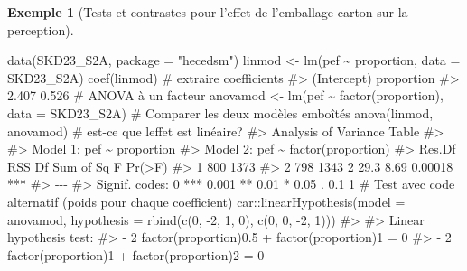 \documentclass[
  11pt,
  letterpaper,
]{scrbook}
\newenvironment{Shaded}{\begin{snugshade}}{\end{snugshade}}
\newcommand{\AttributeTok}[1]{\textcolor[rgb]{0.40,0.45,0.13}{#1}}
\newcommand{\CommentTok}[1]{\textcolor[rgb]{0.37,0.37,0.37}{#1}}
\newcommand{\DecValTok}[1]{\textcolor[rgb]{0.68,0.00,0.00}{#1}}
\newcommand{\FunctionTok}[1]{\textcolor[rgb]{0.28,0.35,0.67}{#1}}
\newcommand{\NormalTok}[1]{\textcolor[rgb]{0.00,0.23,0.31}{#1}}
\newcommand{\OtherTok}[1]{\textcolor[rgb]{0.00,0.23,0.31}{#1}}
\newcommand{\SpecialCharTok}[1]{\textcolor[rgb]{0.37,0.37,0.37}{#1}}
\newcommand{\StringTok}[1]{\textcolor[rgb]{0.13,0.47,0.30}{#1}}
\theoremstyle{plain}
\theoremstyle{plain}
\theoremstyle{definition}
\newtheorem{example}{Exemple}[chapter]
\theoremstyle{definition}
\theoremstyle{remark}
\begin{document}
\begin{example}[Tests et contrastes pour l'effet de l'emballage carton
sur la
perception]
\begin{Shaded}
\begin{Highlighting}[]
\FunctionTok{data}\NormalTok{(SKD23\_S2A, }\AttributeTok{package =} \StringTok{"hecedsm"}\NormalTok{)}
\NormalTok{linmod }\OtherTok{\textless{}{-}} \FunctionTok{lm}\NormalTok{(pef }\SpecialCharTok{\textasciitilde{}}\NormalTok{ proportion, }\AttributeTok{data =}\NormalTok{ SKD23\_S2A)}
\FunctionTok{coef}\NormalTok{(linmod) }\CommentTok{\# extraire coefficients}
\CommentTok{\#\textgreater{} (Intercept)  proportion }
\CommentTok{\#\textgreater{}       2.407       0.526}
\CommentTok{\# ANOVA à un facteur}
\NormalTok{anovamod }\OtherTok{\textless{}{-}} \FunctionTok{lm}\NormalTok{(pef }\SpecialCharTok{\textasciitilde{}} \FunctionTok{factor}\NormalTok{(proportion),}
               \AttributeTok{data =}\NormalTok{ SKD23\_S2A)}
\CommentTok{\# Comparer les deux modèles emboîtés}
\FunctionTok{anova}\NormalTok{(linmod, anovamod) }\CommentTok{\# est{-}ce que l\textquotesingle{}effet est linéaire?}
\CommentTok{\#\textgreater{} Analysis of Variance Table}
\CommentTok{\#\textgreater{} }
\CommentTok{\#\textgreater{} Model 1: pef \textasciitilde{} proportion}
\CommentTok{\#\textgreater{} Model 2: pef \textasciitilde{} factor(proportion)}
\CommentTok{\#\textgreater{}   Res.Df  RSS Df Sum of Sq    F  Pr(\textgreater{}F)    }
\CommentTok{\#\textgreater{} 1    800 1373                              }
\CommentTok{\#\textgreater{} 2    798 1343  2      29.3 8.69 0.00018 ***}
\CommentTok{\#\textgreater{} {-}{-}{-}}
\CommentTok{\#\textgreater{} Signif. codes:  0 \textquotesingle{}***\textquotesingle{} 0.001 \textquotesingle{}**\textquotesingle{} 0.01 \textquotesingle{}*\textquotesingle{} 0.05 \textquotesingle{}.\textquotesingle{} 0.1 \textquotesingle{} \textquotesingle{} 1}
\CommentTok{\# Test avec code alternatif (poids pour chaque coefficient)}
\NormalTok{car}\SpecialCharTok{::}\FunctionTok{linearHypothesis}\NormalTok{(}\AttributeTok{model =}\NormalTok{ anovamod,}
   \AttributeTok{hypothesis =} \FunctionTok{rbind}\NormalTok{(}\FunctionTok{c}\NormalTok{(}\DecValTok{0}\NormalTok{, }\SpecialCharTok{{-}}\DecValTok{2}\NormalTok{, }\DecValTok{1}\NormalTok{, }\DecValTok{0}\NormalTok{),}
                      \FunctionTok{c}\NormalTok{(}\DecValTok{0}\NormalTok{, }\DecValTok{0}\NormalTok{, }\SpecialCharTok{{-}}\DecValTok{2}\NormalTok{, }\DecValTok{1}\NormalTok{)))}
\CommentTok{\#\textgreater{} }
\CommentTok{\#\textgreater{} Linear hypothesis test:}
\CommentTok{\#\textgreater{} {-} 2 factor(proportion)0.5  + factor(proportion)1 = 0}
\CommentTok{\#\textgreater{} {-} 2 factor(proportion)1  + factor(proportion)2 = 0}

\end{Highlighting}
\end{Shaded}
\end{example}
\end{document}
